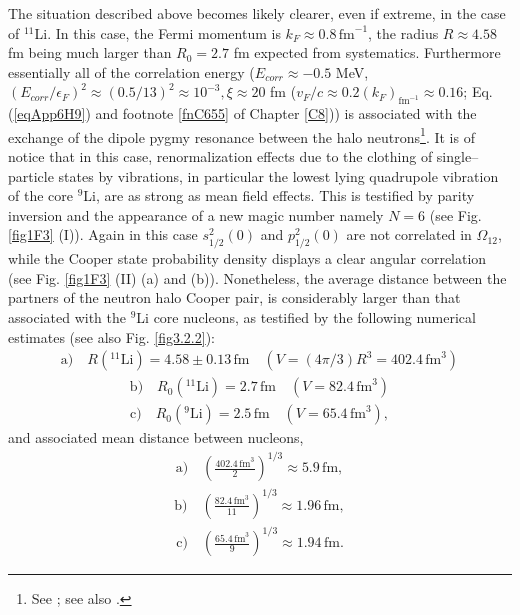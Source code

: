 The situation described above becomes likely clearer, even if extreme, in the case of $^{11}$Li. In this case, the Fermi momentum is $k_F\approx 0.8\, \text{fm}^{-1}$, the radius $R\approx 4.58 $fm being much larger than $R_0=2.7$ fm expected from systematics. Furthermore essentially all of the correlation energy ($E_{corr}\approx -0.5$ MeV, $(E_{corr}/\epsilon_F)^2\approx (0.5/13)^2\approx 10^{-3}, \xi\approx 20 $ fm ($v_F/c\approx0.2(k_F)_{\text{fm}^{-1}}\approx 0.16$; Eq. (\ref{eqApp6H9}) and footnote \ref{fnC655} of Chapter \ref{C8})) is associated with the exchange of the dipole pygmy resonance between the halo neutrons\footnote{See \cite{Barranco:01}; see also \cite{Broglia:19}.}. It is of notice that in this case, renormalization effects due to the clothing of single--particle states by vibrations, in particular the lowest lying quadrupole vibration of the core $^9$Li, are as strong as mean field effects. This is testified by parity inversion and the appearance of a new magic number namely $N=6$ (see Fig. \ref{fig1F3} (I)). Again in this case $s_{1/2}^2(0)$ and $p_{1/2}^2(0)$ are not correlated in $\Omega_{12}$, while the Cooper state probability density displays a clear angular correlation (see Fig. \ref{fig1F3} (II) (a) and (b)). Nonetheless, the average distance between the partners of the neutron halo Cooper pair, is considerably larger than that associated with the $^9$Li core nucleons, as testified by the following numerical estimates (see also Fig. \ref{fig3.2.2}):
\begin{align}\label{eq3.2.21}
 \text{a)}\quad R(^{11}\text{Li})= 4.58\pm 0.13 \,\text{fm}\quad (V=\left(4\pi/3\right)R^3=402.4 \,\text{fm}^3)
\end{align}
\begin{align}
 \text{b)}\quad R_0 (^{11}\text{Li})=2.7\,\text{fm}\quad (V=82.4\,\text{fm}^3)
\end{align}
\begin{align}
 \text{c)}\quad R_0 (^{9}\text{Li})=2.5\,\text{fm}\quad (V=65.4\,\text{fm}^3),
\end{align}
and associated mean distance between nucleons, 
\begin{align}\label{eq3.2.24}
 \text{a)}\quad \left(\frac{402.4\,\text{fm}^3}{2}\right)^{1/3}\approx 5.9\,\text{fm},
\end{align}
\begin{align}
 \text{b)}\quad \left(\frac{82.4\,\text{fm}^3}{11}\right)^{1/3}\approx 1.96\,\text{fm},
\end{align}
\begin{align}
 \text{c)}\quad \left(\frac{65.4\,\text{fm}^3}{9}\right)^{1/3}\approx 1.94\,\text{fm}.
\end{align}



